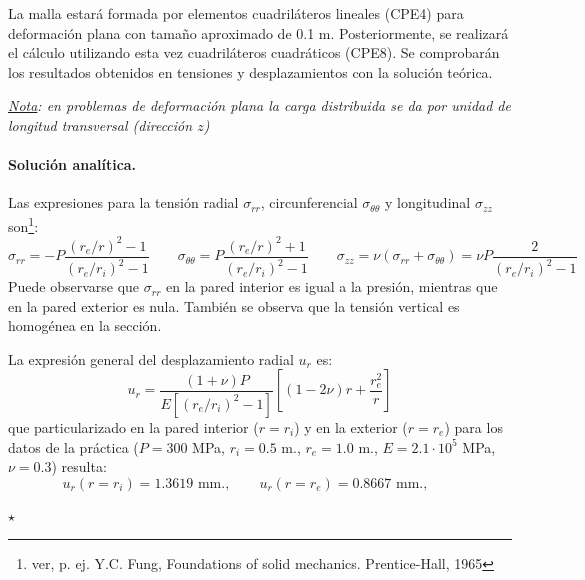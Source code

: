 \documentclass[a4paper,12pt]{article}
\begin{document}
La malla estará formada por elementos cuadriláteros lineales (CPE4) para deformación plana con tamaño aproximado de 0.1 m. Posteriormente, se realizará el cálculo utilizando esta vez cuadriláteros cuadráticos (CPE8). Se comprobarán los resultados obtenidos en tensiones y desplazamientos con la solución teórica.

\noindent

\vspace{4mm}
{\em \underline {Nota}: en problemas de deformación plana
la carga distribuida se da por unidad de longitud transversal
(dirección $z$)}

\paragraph{Solución analítica.}   Las expresiones para la 
tensión radial $\sigma_{rr}$,
circunferencial $\sigma_{\theta \theta}$ y longitudinal $\sigma_{zz}$ 
son\footnote{ver, p. ej. Y.C. Fung, Foundations of solid mechanics. Prentice-Hall, 1965}:
\begin{equation*} 
\sigma_{rr}=-P \frac{{( r_e/r) }^2 -1}
{{( r_e/r_i)}^2 -1} \qquad 
\sigma_{\theta \theta}=
P \frac{{( r_e/r) }^2 +1}
{{( r_e/r_i)}^2 -1} \qquad 
\sigma_{zz}=\nu(\sigma_{rr}+\sigma_{\theta \theta})
=\nu P \frac{2}
{{( r_e/r_i)}^2 -1}
\end{equation*} 
Puede observarse que $\sigma_{rr}$ en la pared interior es igual
a la presión, mientras que en la pared exterior es nula.  También se
observa que la tensión vertical es homogénea en la sección.

La expresión general del desplazamiento radial $u_r$ es:
\begin{equation*}
u_r=\frac{(1+\nu)P}{E [{(r_e/r_i)}^2-1 ]} \left [ 
(1-2 \nu) r +\frac{r_e^2}{r} \right ] 
\end{equation*}
que particularizado en la pared interior ($r=r_i$) y en la exterior ($r=r_e$)
para los datos de la práctica ($P=300$ MPa, $r_i=0.5$ m., $r_e=1.0$ m., 
$E=2.1 \cdot 10^5$ MPa, $\nu=0.3$) resulta:
\begin{equation*}
u_r(r=r_i)=1.3619 \textrm{ mm.},\qquad
u_r(r=r_e)=0.8667 \textrm{ mm.},\qquad
\end{equation*}

\vspace{10mm}

\hspace{20mm}\hrulefill$\star$\hrulefill\hspace{20mm}
\end{document}
